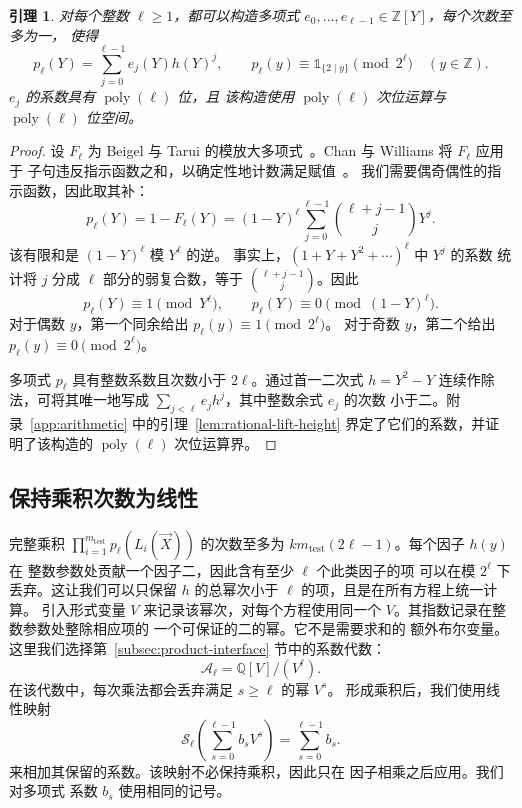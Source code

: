 \documentclass[11pt,reqno]{amsart}
\numberwithin{equation}{section}
\newtheorem{lemma}[theorem]{引理}
\theoremstyle{definition}\newtheorem{definition}[theorem]{定义}
\theoremstyle{remark}\newtheorem{remark}[theorem]{注}
\newcommand{\poly}{\operatorname{poly}}
\renewcommand{\ge}{\geqslant}
\begin{document}
\begin{lemma}\label{lem:rational-idempotent}
对每个整数 $\ell\ge1$，都可以构造多项式
$e_0,\ldots,e_{\ell-1}\in\mathbb Z[Y]$，每个次数至多为一，
使得
\begin{equation}\label{eq:idempotent-expansion}
 p_\ell(Y)=\sum_{j=0}^{\ell-1}e_j(Y)h(Y)^j,
 \qquad
 p_\ell(y)\equiv\mathds{1}_{\{2\mid y\}}\pmod{2^\ell}
 \quad(y\in\mathbb Z).
\end{equation}
$e_j$ 的系数具有 $\poly(\ell)$ 位，且
该构造使用 $\poly(\ell)$ 次位运算与 $\poly(\ell)$
位空间。
\end{lemma}
\begin{proof}
设 $F_\ell$ 为 Beigel 与
Tarui 的模放大多项式~\cite[Section~2.3]{BT94}。Chan 与 Williams 将 $F_\ell$ 应用于
子句违反指示函数之和，以确定性地计数满足赋值~\cite[Theorem~2.5 and proof of Theorem~1.6]{CW21}。
我们需要偶奇偶性的指示函数，因此取其补：
\begin{equation}\label{eq:binary-indicator}
 p_\ell(Y)=1-F_\ell(Y)=(1-Y)^\ell
       \sum_{j=0}^{\ell-1}\binom{\ell+j-1}{j}Y^j.
\end{equation}
该有限和是 $(1-Y)^\ell$ 模 $Y^\ell$ 的逆。
事实上，$(1+Y+Y^2+\cdots)^\ell$ 中 $Y^j$ 的系数
统计将 $j$ 分成 $\ell$ 部分的弱复合数，等于
$\binom{\ell+j-1}{j}$。因此
\[
 p_\ell(Y)\equiv1\pmod{Y^\ell},
 \qquad
 p_\ell(Y)\equiv0\pmod{(1-Y)^\ell}.
\]
对于偶数 $y$，第一个同余给出 $p_\ell(y)\equiv1\pmod{2^\ell}$。
对于奇数 $y$，第二个给出 $p_\ell(y)\equiv0\pmod{2^\ell}$。

多项式 $p_\ell$ 具有整数系数且次数小于
$2\ell$。通过首一二次式
$h=Y^2-Y$ 连续作除法，可将其唯一地写成
$\sum_{j<\ell}e_jh^j$，其中整数余式 $e_j$ 的次数
小于二。附录~\ref{app:arithmetic} 中的引理~\ref{lem:rational-lift-height}
界定了它们的系数，并证明了该构造的 $\poly(\ell)$ 次位运算界。
\end{proof}

\subsection{保持乘积次数为线性}
完整乘积 $\prod_{i=1}^{m_{\mathrm{test}}} p_\ell(L_i(\vec{X}))$ 的次数至多为
$km_{\mathrm{test}}(2\ell-1)$。每个因子 $h(y)$ 在
整数参数处贡献一个因子二，因此含有至少 $\ell$ 个此类因子的项
可以在模 $2^\ell$ 下丢弃。这让我们可以只保留
$h$ 的总幂次小于 $\ell$ 的项，且是在所有方程上统一计算。
引入形式变量 $V$ 来记录该幂次，对每个方程使用同一个
$V$。其指数记录在整数参数处整除相应项的
一个可保证的二的幂。它不是需要求和的
额外布尔变量。
这里我们选择第~\ref{subsec:product-interface} 节中的系数代数：
\[
 \mathcal A_\ell=\mathbb Q[V]/(V^\ell).
\]
在该代数中，每次乘法都会丢弃满足 $s\ge\ell$ 的幂 $V^s$。
形成乘积后，我们使用线性映射
\[
 \mathcal S_\ell\!\left(\sum_{s=0}^{\ell-1}b_sV^s\right)
 =\sum_{s=0}^{\ell-1}b_s .
\]
来相加其保留的系数。该映射不必保持乘积，因此只在
因子相乘之后应用。我们对多项式
系数 $b_s$ 使用相同的记号。
\end{document}
